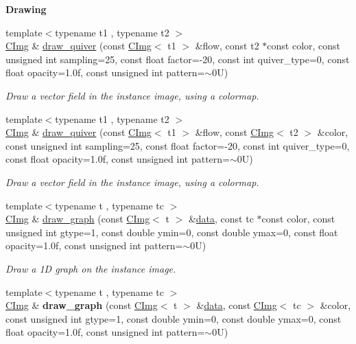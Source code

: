 \begin{Indent}{\bf Drawing}
\begin{DoxyCompactItemize}
\item 
{\footnotesize template$<$typename t1 , typename t2 $>$ }\\\hyperlink{structcimg__library_1_1_c_img}{C\-Img} \& \hyperlink{structcimg__library_1_1_c_img_a626861dc04366a1ea30e07ef6e9a1eac}{draw\-\_\-quiver} (const \hyperlink{structcimg__library_1_1_c_img}{C\-Img}$<$ t1 $>$ \&flow, const t2 $\ast$const color, const unsigned int sampling=25, const float factor=-\/20, const int quiver\-\_\-type=0, const float opacity=1.\-0f, const unsigned int pattern=$\sim$0\-U)
\begin{DoxyCompactList}\small\item\em Draw a vector field in the instance image, using a colormap. \end{DoxyCompactList}\item 
{\footnotesize template$<$typename t1 , typename t2 $>$ }\\\hyperlink{structcimg__library_1_1_c_img}{C\-Img} \& \hyperlink{structcimg__library_1_1_c_img_a86670dddc872143ddc00db53d51ff3aa}{draw\-\_\-quiver} (const \hyperlink{structcimg__library_1_1_c_img}{C\-Img}$<$ t1 $>$ \&flow, const \hyperlink{structcimg__library_1_1_c_img}{C\-Img}$<$ t2 $>$ \&color, const unsigned int sampling=25, const float factor=-\/20, const int quiver\-\_\-type=0, const float opacity=1.\-0f, const unsigned int pattern=$\sim$0\-U)
\begin{DoxyCompactList}\small\item\em Draw a vector field in the instance image, using a colormap. \end{DoxyCompactList}\item 
{\footnotesize template$<$typename t , typename tc $>$ }\\\hyperlink{structcimg__library_1_1_c_img}{C\-Img} \& \hyperlink{structcimg__library_1_1_c_img_a25913106bea95e3eb8f9f380cccfda82}{draw\-\_\-graph} (const \hyperlink{structcimg__library_1_1_c_img}{C\-Img}$<$ t $>$ \&\hyperlink{structcimg__library_1_1_c_img_a54f252b86f19b2217aef3ec9e1e2e013}{data}, const tc $\ast$const color, const unsigned int gtype=1, const double ymin=0, const double ymax=0, const float opacity=1.\-0f, const unsigned int pattern=$\sim$0\-U)
\begin{DoxyCompactList}\small\item\em Draw a 1\-D graph on the instance image. \end{DoxyCompactList}\item 
\hypertarget{structcimg__library_1_1_c_img_ad896b679293ce61690c9cf81569febc0}{{\footnotesize template$<$typename t , typename tc $>$ }\\\hyperlink{structcimg__library_1_1_c_img}{C\-Img} \& {\bfseries draw\-\_\-graph} (const \hyperlink{structcimg__library_1_1_c_img}{C\-Img}$<$ t $>$ \&\hyperlink{structcimg__library_1_1_c_img_a54f252b86f19b2217aef3ec9e1e2e013}{data}, const \hyperlink{structcimg__library_1_1_c_img}{C\-Img}$<$ tc $>$ \&color, const unsigned int gtype=1, const double ymin=0, const double ymax=0, const float opacity=1.\-0f, const unsigned int pattern=$\sim$0\-U)}\label{structcimg__library_1_1_c_img_ad896b679293ce61690c9cf81569febc0}


\end{DoxyCompactItemize}
\end{Indent}
